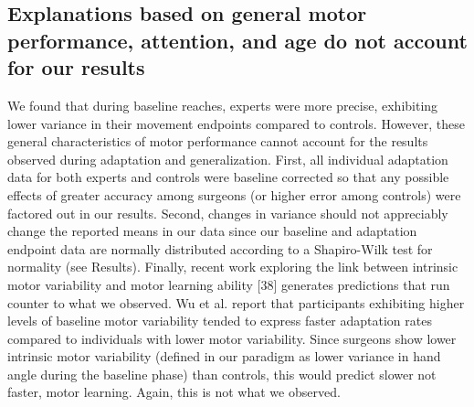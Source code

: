 \documentclass[jou, apacite, 11pt, longtable, floatsintext, notab]{apa6}
\begin{document}

\subsection{Explanations based on general motor performance,
  attention, and age do not account for our results}
We found that during baseline reaches, experts were more
precise, exhibiting lower variance in their movement
endpoints compared to controls. However, these general
characteristics of motor performance cannot account for the
results observed during adaptation and generalization.
First, all individual adaptation data for both experts and
controls were baseline corrected so that any possible
effects of greater accuracy among surgeons (or higher error
among controls) were factored out in our results. Second,
changes in variance should not appreciably change the
reported means in our data since our baseline and adaptation
endpoint data are normally distributed according to a
Shapiro-Wilk test for normality (see Results). Finally,
recent work exploring the link between intrinsic motor
variability and motor learning ability [38] generates
predictions that run counter to what we observed. Wu et al.
report that participants exhibiting higher levels of
baseline motor variability tended to express faster
adaptation rates compared to individuals with lower motor
variability. Since surgeons show lower intrinsic motor
variability (defined in our paradigm as lower variance in
hand angle during the baseline phase) than controls, this
would predict slower not faster, motor learning. Again, this
is not what we observed.
\end{document}

